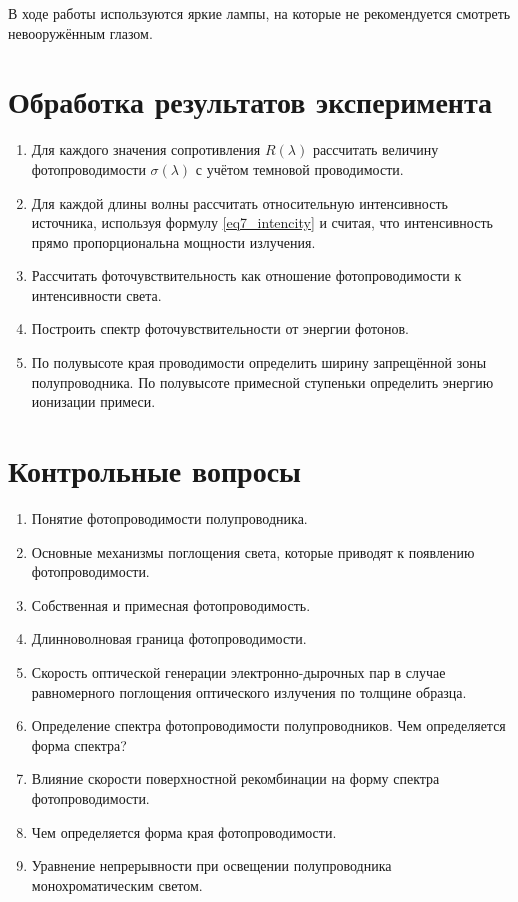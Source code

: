 В ходе работы используются яркие лампы, на которые не рекомендуется смотреть невооружённым глазом.

\section{Обработка результатов эксперимента}

\begin{enumerate}
\item Для каждого значения сопротивления $R(\lambda)$ рассчитать величину фотопроводимости $\sigma(\lambda)$ с учётом темновой проводимости.
\item Для каждой длины волны рассчитать относительную интенсивность источника, используя формулу \ref{eq7_intencity} и считая, что интенсивность прямо пропорциональна мощности излучения.
\item Рассчитать фоточувствительность как отношение фотопроводимости к интенсивности света.
\item Построить спектр фоточувствительности от энергии фотонов.
\item По полувысоте края проводимости определить ширину запрещённой зоны полупроводника. По полувысоте примесной ступеньки определить энергию ионизации примеси.
\end{enumerate}

\section{Контрольные вопросы}

\begin{enumerate}
\item Понятие фотопроводимости полупроводника.
\item Основные механизмы поглощения света, которые приводят к появлению фотопроводимости.
\item Собственная и примесная фотопроводимость.
\item Длинноволновая граница фотопроводимости.
\item Скорость оптической генерации электронно-дырочных пар в случае равномерного поглощения оптического излучения по толщине образца.
\item Определение спектра фотопроводимости полупроводников. Чем определяется форма спектра?
\item Влияние скорости поверхностной рекомбинации на форму спектра фотопроводимости.
\item Чем определяется форма края фотопроводимости.
\item Уравнение непрерывности при освещении полупроводника монохроматическим светом.
\end{enumerate}

